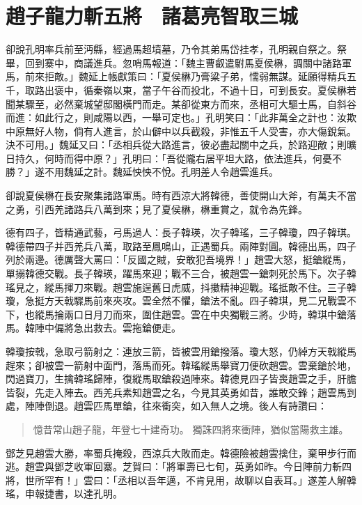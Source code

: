 
\chapter{趙子龍力斬五將　諸葛亮智取三城}

卻說孔明率兵前至沔縣，經過馬超墳墓，乃令其弟馬岱挂孝，孔明親自祭之。祭畢，回到寨中，商議進兵。忽哨馬報道：「魏主曹叡遣駙馬夏侯楙，調關中諸路軍馬，前來拒敵。」魏延上帳獻策曰：「夏侯楙乃膏粱子弟，懦弱無謀。延願得精兵五千，取路出褒中，循秦嶺以東，當子午谷而投北，不過十日，可到長安。夏侯楙若聞某驟至，必然棄城望邸閣橫門而走。某卻從東方而來，丞相可大驅士馬，自斜谷而進：如此行之，則咸陽以西，一舉可定也。」孔明笑曰：「此非萬全之計也：汝欺中原無好人物，倘有人進言，於山僻中以兵截殺，非惟五千人受害，亦大傷銳氣。決不可用。」魏延又曰：「丞相兵從大路進言，彼必盡起關中之兵，於路迎敵；則曠日持久，何時而得中原？」孔明曰：「吾從隴右居平坦大路，依法進兵，何憂不勝？」遂不用魏延之計。魏延怏怏不悅。孔明差人令趙雲進兵。

卻說夏侯楙在長安聚集諸路軍馬。時有西涼大將韓德，善使開山大斧，有萬夫不當之勇，引西羌諸路兵八萬到來；見了夏侯楙，楙重賞之，就令為先鋒。

德有四子，皆精通武藝，弓馬過人：長子韓瑛，次子韓瑤，三子韓瓊，四子韓琪。韓德帶四子并西羌兵八萬，取路至鳳鳴山，正遇蜀兵。兩陣對圓。韓德出馬，四子列於兩邊。德厲聲大罵曰：「反國之賊，安敢犯吾境界！」趙雲大怒，挺鎗縱馬，單搦韓德交戰。長子韓瑛，躍馬來迎；戰不三合，被趙雲一鎗刺死於馬下。次子韓瑤見之，縱馬揮刀來戰。趙雲施逞舊日虎威，抖擻精神迎戰。瑤抵敵不住。三子韓瓊，急挺方天戟驟馬前來夾攻。雲全然不懼，鎗法不亂。四子韓琪，見二兄戰雲不下，也縱馬掄兩口日月刀而來，圍住趙雲。雲在中央獨戰三將。少時，韓琪中鎗落馬。韓陣中偏將急出救去。雲拖鎗便走。

韓瓊按戟，急取弓箭射之：連放三箭，皆被雲用鎗撥落。瓊大怒，仍綽方天戟縱馬趕來；卻被雲一箭射中面門，落馬而死。韓瑤縱馬舉寶刀便砍趙雲。雲棄鎗於地，閃過寶刀，生擒韓瑤歸陣，復縱馬取鎗殺過陣來。韓德見四子皆喪趙雲之手，肝膽皆裂，先走入陣去。西羌兵素知趙雲之名，今見其英勇如昔，誰敢交鋒；趙雲馬到處，陣陣倒退。趙雲匹馬單鎗，往來衝突，如入無人之境。後人有詩讚曰：

\begin{quote}
憶昔常山趙子龍，年登七十建奇功。
獨誅四將來衝陣，猶似當陽救主雄。
\end{quote}

鄧芝見趙雲大勝，率蜀兵掩殺，西涼兵大敗而走。韓德險被趙雲擒住，棄甲步行而逃。趙雲與鄧芝收軍回寨。芝賀曰：「將軍壽已七旬，英勇如昨。今日陣前力斬四將，世所罕有！」雲曰：「丞相以吾年邁，不肯見用，故聊以自表耳。」遂差人解韓瑤，申報捷書，以達孔明。

